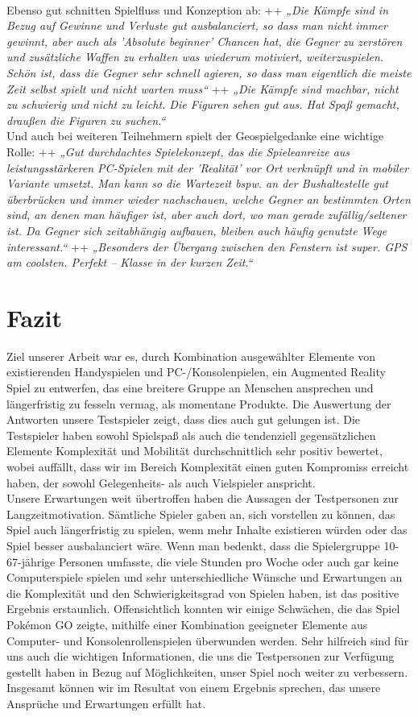 \documentclass[extern,palatino]{cgBA}
\begin{document}
\\
Ebenso gut schnitten Spielfluss und Konzeption ab: ++ \textit{„Die Kämpfe sind in Bezug auf Gewinne und Verluste gut ausbalanciert, so dass man nicht immer gewinnt, aber auch als 'Absolute beginner' Chancen hat, die Gegner zu zerstören und zusätzliche Waffen zu erhalten was wiederum motiviert, weiterzuspielen. Schön ist, dass die Gegner sehr schnell agieren, so dass man eigentlich die meiste Zeit selbst spielt und nicht warten muss“} ++ \textit{„Die Kämpfe sind machbar, nicht zu schwierig und nicht zu leicht. Die Figuren sehen gut aus. Hat Spaß gemacht, draußen die Figuren zu suchen.“}
\\
Und auch bei weiteren Teilnehmern spielt der Geospielgedanke eine wichtige Rolle: ++ \textit{„Gut durchdachtes Spielekonzept, das die Spieleanreize aus leistungsstärkeren PC-Spielen mit der 'Realität' vor Ort verknüpft und in mobiler Variante umsetzt. Man kann so die Wartezeit bspw. an der Bushaltestelle gut überbrücken und immer wieder nachschauen, welche Gegner an bestimmten Orten sind, an denen man häufiger ist, aber auch dort, wo man gerade zufällig/seltener ist. Da Gegner sich zeitabhängig aufbauen, bleiben auch häufig genutzte Wege interessant.“} ++ \textit{„Besonders der Übergang zwischen den Fenstern ist super. GPS am coolsten. Perfekt – Klasse in der kurzen Zeit.“}

\section{Fazit}Ziel unserer Arbeit war es, durch Kombination ausgewählter Elemente von existierenden Handyspielen und PC-/Konsolenpielen, ein Augmented Reality Spiel zu entwerfen, das eine breitere Gruppe an Menschen ansprechen und längerfristig zu fesseln vermag, als momentane Produkte. Die Auswertung der Antworten unsere Testspieler zeigt, dass dies auch gut gelungen ist. Die Testspieler haben sowohl Spielspaß als auch die tendenziell gegensätzlichen Elemente Komplexität und Mobilität durchschnittlich sehr positiv bewertet, wobei auffällt, dass wir im Bereich Komplexität einen guten Kompromiss erreicht haben, der sowohl Gelegenheits- als auch Vielspieler anspricht. 
\\Unsere Erwartungen weit übertroffen haben die Aussagen der Testpersonen zur Langzeitmotivation. Sämtliche Spieler gaben an, sich vorstellen zu können, das Spiel auch längerfristig zu spielen, wenn mehr Inhalte existieren würden oder das Spiel besser ausbalanciert wäre. Wenn man bedenkt, dass die Spielergruppe 10-67-jährige Personen umfasste, die viele Stunden pro Woche oder auch gar keine Computerspiele spielen und sehr unterschiedliche Wünsche und Erwartungen an die Komplexität und den Schwierigkeitsgrad von Spielen haben, ist das positive Ergebnis erstaunlich. Offensichtlich konnten wir einige Schwächen, die das Spiel Pokémon GO zeigte, mithilfe einer Kombination geeigneter Elemente aus Computer- und Konsolenrollenspielen überwunden werden. Sehr hilfreich sind für uns auch die wichtigen Informationen, die uns die Testpersonen zur Verfügung gestellt haben in Bezug auf Möglichkeiten, unser Spiel noch weiter zu verbessern. Insgesamt können wir im Resultat von einem Ergebnis sprechen, das unsere Ansprüche und Erwartungen erfüllt hat.
\newpage
\end{document}
